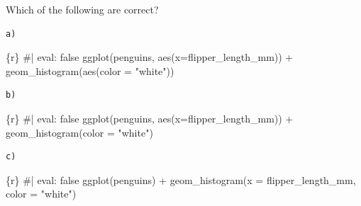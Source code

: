 \documentclass[
  letterpaper,
  DIV=11,
  numbers=noendperiod]{scrreprt}
\newenvironment{Shaded}{\begin{snugshade}}{\end{snugshade}}
\newcommand{\AttributeTok}[1]{\textcolor[rgb]{0.40,0.45,0.13}{#1}}
\newcommand{\CommentTok}[1]{\textcolor[rgb]{0.37,0.37,0.37}{#1}}
\newcommand{\FunctionTok}[1]{\textcolor[rgb]{0.28,0.35,0.67}{#1}}
\newcommand{\InformationTok}[1]{\textcolor[rgb]{0.37,0.37,0.37}{#1}}
\newcommand{\NormalTok}[1]{\textcolor[rgb]{0.00,0.23,0.31}{#1}}
\newcommand{\SpecialCharTok}[1]{\textcolor[rgb]{0.37,0.37,0.37}{#1}}
\newcommand{\StringTok}[1]{\textcolor[rgb]{0.13,0.47,0.30}{#1}}
\begin{document}
\begin{tcolorbox}[enhanced jigsaw, breakable, colback=white, bottomrule=.15mm, leftrule=.75mm, colframe=quarto-callout-note-color-frame, arc=.35mm, rightrule=.15mm, toprule=.15mm, left=2mm, opacityback=0]

Which of the following are correct?

\begin{verbatim}
a)  
\end{verbatim}

\begin{Shaded}
\begin{Highlighting}[]
\InformationTok{\textasciigrave{}\textasciigrave{}\textasciigrave{}\{r\}}
\CommentTok{\#| eval: false}
\FunctionTok{ggplot}\NormalTok{(penguins, }\FunctionTok{aes}\NormalTok{(}\AttributeTok{x=}\NormalTok{flipper\_length\_mm)) }\SpecialCharTok{+}
  \FunctionTok{geom\_histogram}\NormalTok{(}\FunctionTok{aes}\NormalTok{(}\AttributeTok{color =} \StringTok{"white"}\NormalTok{))}
\InformationTok{\textasciigrave{}\textasciigrave{}\textasciigrave{}}
\end{Highlighting}
\end{Shaded}

\begin{verbatim}
b)  
\end{verbatim}

\begin{Shaded}
\begin{Highlighting}[]
\InformationTok{\textasciigrave{}\textasciigrave{}\textasciigrave{}\{r\}}
\CommentTok{\#| eval: false}
\FunctionTok{ggplot}\NormalTok{(penguins, }\FunctionTok{aes}\NormalTok{(}\AttributeTok{x=}\NormalTok{flipper\_length\_mm)) }\SpecialCharTok{+}
  \FunctionTok{geom\_histogram}\NormalTok{(}\AttributeTok{color =} \StringTok{"white"}\NormalTok{)}
\InformationTok{\textasciigrave{}\textasciigrave{}\textasciigrave{}}
\end{Highlighting}
\end{Shaded}

\begin{verbatim}
c)  
\end{verbatim}

\begin{Shaded}
\begin{Highlighting}[]
\InformationTok{\textasciigrave{}\textasciigrave{}\textasciigrave{}\{r\}}
\CommentTok{\#| eval: false}
\FunctionTok{ggplot}\NormalTok{(penguins) }\SpecialCharTok{+}
  \FunctionTok{geom\_histogram}\NormalTok{(}\AttributeTok{x =}\NormalTok{ flipper\_length\_mm, }\AttributeTok{color =} \StringTok{"white"}\NormalTok{)}
\InformationTok{\textasciigrave{}\textasciigrave{}\textasciigrave{}}
\end{Highlighting}
\end{Shaded}


\end{tcolorbox}
\end{document}
